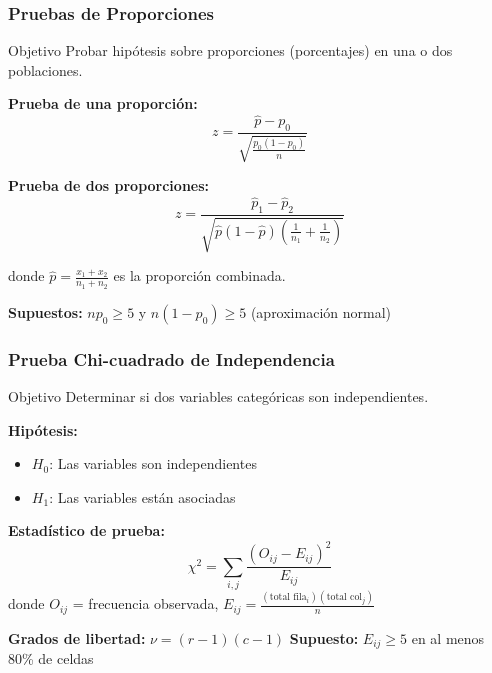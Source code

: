 \documentclass[aspectratio=169,11pt]{beamer}
\begin{document}
\begin{frame}
  \frametitle{Pruebas de Proporciones}
  \small
  \begin{block}{Objetivo}
    Probar hip\'otesis sobre proporciones (porcentajes) en una o dos poblaciones.
  \end{block}

  \textbf{Prueba de una proporci\'on:}
  \[
    z = \frac{\hat{p} - p_0}{\sqrt{\frac{p_0(1-p_0)}{n}}}
  \]

  \textbf{Prueba de dos proporciones:}
  \[
    z = \frac{\hat{p}_1 - \hat{p}_2}{\sqrt{\hat{p}(1-\hat{p})\left(\frac{1}{n_1} + \frac{1}{n_2}\right)}}
  \]

  donde $\hat{p} = \frac{x_1 + x_2}{n_1 + n_2}$ es la proporci\'on combinada.

  \vspace{0.2cm}
  \textbf{Supuestos:} $np_0 \geq 5$ y $n(1-p_0) \geq 5$ (aproximaci\'on normal)
\end{frame}

\begin{frame}
  \frametitle{Prueba Chi-cuadrado de Independencia}
  \small
  \begin{block}{Objetivo}
    Determinar si dos variables categ\'oricas son independientes.
  \end{block}

  \textbf{Hip\'otesis:}
  \begin{itemize}
    \item $H_0$: Las variables son independientes
    \item $H_1$: Las variables est\'an asociadas
  \end{itemize}

  \vspace{0.2cm}
  \textbf{Estad\'istico de prueba:}
  \[
    \chi^2 = \sum_{i,j} \frac{(O_{ij} - E_{ij})^2}{E_{ij}}
  \]
  donde $O_{ij}$ = frecuencia observada, $E_{ij} = \frac{(\text{total fila}_i)(\text{total col}_j)}{n}$

  \vspace{0.2cm}
  \textbf{Grados de libertad:} $\nu = (r-1)(c-1)$ \quad \textbf{Supuesto:} $E_{ij} \geq 5$ en al menos 80\% de celdas
\end{frame}
\end{document}
